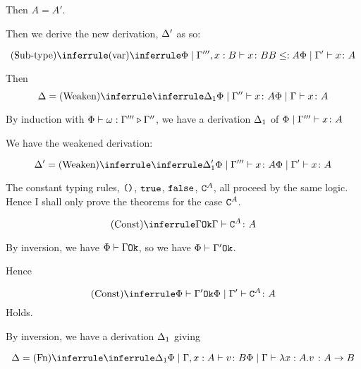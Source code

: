 {        

        Then $A = A'$.

        Then we derive the new derivation, $\Delta'$ as so:

        \begin{equation}
            \ntreeruleII{Sub-type}{
                \ntreeruleI{var}{}{\etyperelation{\P}{\G''', x: B}{x}{B}}
                }{
                B \subtype A
            }{
                \etyperelation{\P}{\G'}{x}{A}
            }
        \end{equation}

        Then 
        \begin{equation}
            \D = \ntreeruleI{Weaken}{\treeruleI{\D_1}{\etyperelation{\P}{\G''}{x}{A}}}{\gpetyperelation{x}{A}}
        \end{equation}

        By induction with $\Phi\vdash \omega : \Gamma''' \triangleright \Gamma''$,
         we have a derivation $\Delta_1$ of $\Phi\mid\Gamma''' \vdash x \colon A$

        We have the weakened derivation:

        \begin{equation}
            \D' = \ntreeruleI{Weaken}{\treeruleI{\D_1'}{\etyperelation{\P}{\G'''}{x}{A}}}{\etyperelation{\P}{\G'}{x}{A}}
        \end{equation}

    The constant typing rules, $\texttt{()}$, $\texttt{true}$, $\texttt{false}$, $\texttt{C}^{A}$, all proceed by the same logic. Hence I shall only prove the theorems for the case $\texttt{C}^{A}$.

    \begin{equation}
        \truleconst
    \end{equation}

    By inversion, we have $\Phi\vdash \Gamma \texttt{Ok}$, so we have $\Phi\vdash \Gamma' \texttt{Ok}$.

    Hence

    \begin{equation}
        \ntreeruleI{Const}{\wellformedok{\P}{\G'}}{\etyperelation{\P}{\G'}{\const{A}}{A}}
    \end{equation}
    Holds.

    By inversion, we have a derivation $\Delta_1$ giving

    \begin{equation}
        \D = \ntreeruleI{Fn}{
            \treeruleI{\D_1}{\etyperelation{\P}{\gax}{v}{B}}
        }{\gpetyperelation{\lam{x}{A}{v}}{\ab}}
    \end{equation}

}
